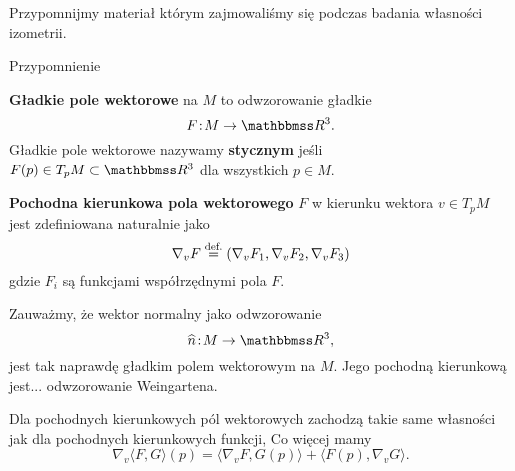 Przypomnijmy materiał którym zajmowaliśmy się podczas badania własności izometrii.
\begin{frame}[<+->]{Przypomnienie}

\begin{definicja}
\textbf{Gładkie pole wektorowe} na $M$ to odwzorowanie gładkie \[F\colon M\to \R^3.\]
Gładkie pole wektorowe nazywamy \textbf{stycznym} jeśli $F(p)\in T_pM\subset \R^3$ dla wszystkich $p\in M$.
\end{definicja}
\begin{definicja}
\textbf{Pochodna kierunkowa pola wektorowego} $F$ w kierunku wektora $v\in T_p M$ jest zdefiniowana naturalnie jako
\[\nabla_v F\define(\nabla_v F_1,\nabla_vF_2,\nabla_vF_3)\] gdzie $F_i$ są funkcjami współrzędnymi pola $F$.
\end{definicja}

\end{frame}
\begin{frame}

\begin{przyklad}
Zauważmy, że wektor normalny jako odwzorowanie
\[\widehat{n}\colon M\to\R^3,\]
jest tak naprawdę gładkim polem wektorowym na $M$. Jego pochodną kierunkową jest... odwzorowanie Weingartena.
\end{przyklad}


\pause \begin{lemat}
Dla pochodnych kierunkowych pól wektorowych zachodzą takie same własności jak dla pochodnych kierunkowych funkcji, 
 \pause Co więcej mamy 
\[\nabla_v\langle F,G\rangle(p)=\langle\nabla_vF,G(p)\rangle+\langle F(p),\nabla_vG\rangle.\]
\end{lemat}
 
\end{frame}
